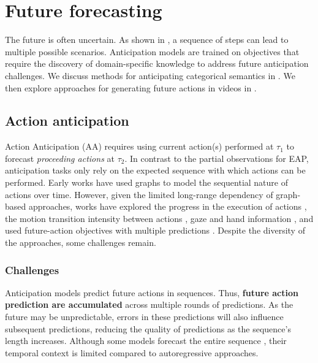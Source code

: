 \section{Future forecasting}
\label{sec:forecasting}

The future is often uncertain. As shown in , a sequence of steps can lead to multiple possible scenarios. Anticipation models are trained on objectives that require the discovery of domain-specific knowledge to address future anticipation challenges. We discuss methods for anticipating categorical semantics in . We then explore approaches for generating future actions in videos in .



\subsection{Action anticipation}
\label{sec:forecasting::anticipation}

Action Anticipation (AA) requires using current action(s) performed at $\tau_1$ to forecast \emph{proceeding actions} at $\tau_2$. In contrast to the partial observations for EAP, anticipation tasks only rely on the expected sequence with which actions can be performed. Early works \citep{kitani2012activity,kuehne2014language,koppula2015anticipating} have used graphs to model the sequential nature of actions over time. However, given the limited long-range dependency of graph-based approaches, works have explored the progress in the execution of actions \citep{abu2018will,furnari2019would,ke2019time}, the motion transition intensity between actions \citep{huang2014action}, gaze and hand information \citep{shen2018egocentric}, and used future-action objectives with multiple predictions \citep{furnari2018leveraging,zatsarynna2024gated}. Despite the diversity of the approaches, some challenges remain.

\subsubsection{Challenges}

Anticipation models predict future actions in sequences. Thus, \textbf{future action prediction are accumulated} across multiple rounds of predictions. As the future may be unpredictable, errors in these predictions will also influence subsequent predictions, reducing the quality of predictions as the sequence's length increases. Although some models forecast the entire sequence \citep{gong2022future,nawhal2022rethinking}, their temporal context is limited compared to autoregressive approaches.  

